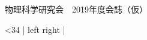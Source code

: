 \documentclass[10pt,b5paper,papersize,dvipdfmx]{jsbook}
\begin{document}
\thispagestyle{empty}

\begin{center}
  {\Large 物理科学研究会　2019年度会誌（仮）}
\end{center}

\newcommand\looploop[2]{
  \setcounter{counter}{0}
  \loop\ifnum\value{counter}<#1
    #2\ignorespaces
  \repeat
}

\looploop{34}{\noindent| left \hfill \the\value{counter} \hfill right |\par}


%
%

\end{document}
